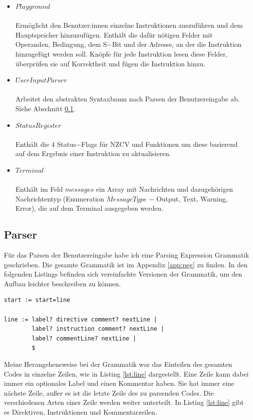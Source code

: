 \documentclass[a4paper, 11pt, onecolumn]{article}
\begin{document}
\begin{itemize}
\item $Playground$\\ \\Ermöglicht den Benutzer:innen einzelne Instruktionen auszuführen und dem Hauptspeicher hinzuzufügen. Enthält die dafür nötigen Felder mit Operanden, Bedingung, dem S$-$Bit und der Adresse, an der die Instruktion hinzugefügt werden soll. Knöpfe für jede Instruktion lesen diese Felder, überprüfen sie auf Korrektheit und fügen die Instruktion hinzu.
\item $UserInputParser$\\ \\Arbeitet den abstrakten Syntaxbaum nach Parsen der Benutzereingabe ab. Siehe Abschnitt \ref{sec:parser}.
\item $StatusRegister$\\ \\Enthält die 4 Status$-$Flags für NZCV und Funktionen um diese basierend auf dem Ergebnis einer Instruktion zu aktualisieren.
\item $Terminal$\\ \\Enthält im Feld $messages$ ein Array mit Nachrichten und dazugehörigen Nachrichtentyp (Enumeration $MessageType$ $-$ Output, Text, Warning, Error), die auf dem Terminal ausgegeben werden.
\end{itemize}



\subsection{Parser}\label{sec:parser}

Für das Parsen der Benutzereingabe habe ich eine Parsing Expression Grammatik \cite{peg} geschrieben. Die gesamte Grammatik ist im Appendix \ref{app:peg} zu finden. In den folgenden Listings befinden sich vereinfachte Versionen der Grammatik, um den Aufbau leichter beschreiben zu können.
\newpage
\begin{lstlisting}[basicstyle=\ttfamily\footnotesize, backgroundcolor=\color{backcolour}, caption={[Grammatik $-$ Zeilen]Einteilung in Zeilen},captionpos=b, label={lst:line}]
start := start=line

line := label? directive comment? nextLine |
        label? instruction comment? nextLine |
        label? commentLine? nextLine |
        $
\end{lstlisting}

Meine Herangehensweise bei der Grammatik war das Einteilen des gesamten Codes in einzelne Zeilen, wie in Listing \ref{lst:line} dargestellt. Eine Zeile kann dabei immer ein optionales Label und einen Kommentar haben. Sie hat immer eine nächste Zeile, außer es ist die letzte Zeile des zu parsenden Codes. Die verschiedenen Arten einer Zeile werden weiter unterteilt. In Listing \ref{lst:line} gibt es Direktiven, Instruktionen und Kommentarzeilen. \\
\end{document}
